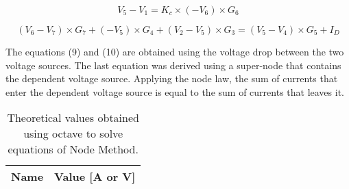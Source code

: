 \begin {equation}
V_5 - V_1 = K_c\times (-V_6)\times G_6
  \label {eq:kvl}
\end{equation}

\begin {equation}
(V_6 - V_7)\times G_7 + (-V_5)\times G_4 + (V_2 - V_5)\times G_3 = (V_5 - V_4)\times G_5 + I_D
  \label {eq:kvl}
\end{equation}

The equations (9) and (10) are obtained using the voltage drop between the two voltage sources. The last equation was derived using a super-node that contains the dependent voltage source. Applying the node law, the sum of currents that enter the dependent voltage source is equal to the sum of currents that leaves it. 

\begin{table}[h]
  \centering
  \begin{tabular}{|l|r|}
    \hline    
    {\bf Name} & {\bf Value [A or V]} \\ \hline
    
  \end{tabular}
  \caption{Theoretical values obtained using octave to solve equations of Node Method.}
  \label{tab:NM}
\end{table}





